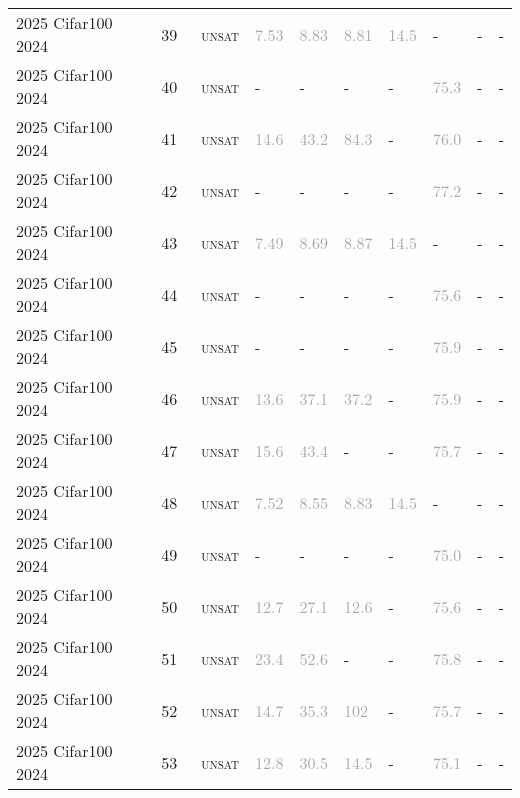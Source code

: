 \begin{center}
{\begin{longtable}{@{}llllllllll@{}}
2025 Cifar100 2024 & 39 & ~\textsc{unsat} & \textcolor{darkgray}{7.53} & \textcolor{darkgray}{8.83} & \textcolor{darkgray}{8.81} & \textcolor{darkgray}{14.5} & - & - & - \\
2025 Cifar100 2024 & 40 & ~\textsc{unsat} & - & - & - & - & \textcolor{darkgray}{75.3} & - & - \\
2025 Cifar100 2024 & 41 & ~\textsc{unsat} & \textcolor{darkgray}{14.6} & \textcolor{darkgray}{43.2} & \textcolor{darkgray}{84.3} & - & \textcolor{darkgray}{76.0} & - & - \\
2025 Cifar100 2024 & 42 & ~\textsc{unsat} & - & - & - & - & \textcolor{darkgray}{77.2} & - & - \\
2025 Cifar100 2024 & 43 & ~\textsc{unsat} & \textcolor{darkgray}{7.49} & \textcolor{darkgray}{8.69} & \textcolor{darkgray}{8.87} & \textcolor{darkgray}{14.5} & - & - & - \\
2025 Cifar100 2024 & 44 & ~\textsc{unsat} & - & - & - & - & \textcolor{darkgray}{75.6} & - & - \\
2025 Cifar100 2024 & 45 & ~\textsc{unsat} & - & - & - & - & \textcolor{darkgray}{75.9} & - & - \\
2025 Cifar100 2024 & 46 & ~\textsc{unsat} & \textcolor{darkgray}{13.6} & \textcolor{darkgray}{37.1} & \textcolor{darkgray}{37.2} & - & \textcolor{darkgray}{75.9} & - & - \\
2025 Cifar100 2024 & 47 & ~\textsc{unsat} & \textcolor{darkgray}{15.6} & \textcolor{darkgray}{43.4} & - & - & \textcolor{darkgray}{75.7} & - & - \\
2025 Cifar100 2024 & 48 & ~\textsc{unsat} & \textcolor{darkgray}{7.52} & \textcolor{darkgray}{8.55} & \textcolor{darkgray}{8.83} & \textcolor{darkgray}{14.5} & - & - & - \\
2025 Cifar100 2024 & 49 & ~\textsc{unsat} & - & - & - & - & \textcolor{darkgray}{75.0} & - & - \\
2025 Cifar100 2024 & 50 & ~\textsc{unsat} & \textcolor{darkgray}{12.7} & \textcolor{darkgray}{27.1} & \textcolor{darkgray}{12.6} & - & \textcolor{darkgray}{75.6} & - & - \\
2025 Cifar100 2024 & 51 & ~\textsc{unsat} & \textcolor{darkgray}{23.4} & \textcolor{darkgray}{52.6} & - & - & \textcolor{darkgray}{75.8} & - & - \\
2025 Cifar100 2024 & 52 & ~\textsc{unsat} & \textcolor{darkgray}{14.7} & \textcolor{darkgray}{35.3} & \textcolor{darkgray}{102} & - & \textcolor{darkgray}{75.7} & - & - \\
2025 Cifar100 2024 & 53 & ~\textsc{unsat} & \textcolor{darkgray}{12.8} & \textcolor{darkgray}{30.5} & \textcolor{darkgray}{14.5} & - & \textcolor{darkgray}{75.1} & - & - \\

\end{longtable}}
\end{center}

